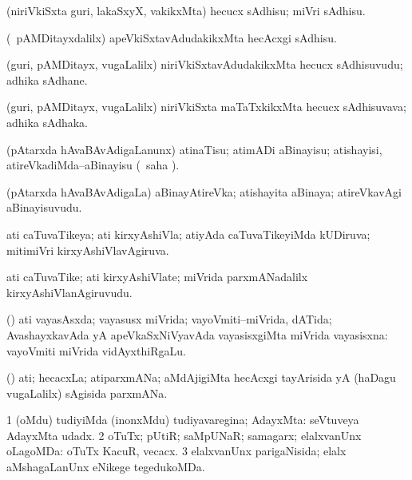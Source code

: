 \bentry
{}
\gl{\sakirx}
\bmng
(niriVkiSxta guri, lakaSxyX, \mo vakikxMta) hecucx sAdhisu; miVri sAdhisu. 
\emng

\noindent
\gl{\akirx}
\bmng
(\kanmu\ pAMDitayxdalilx) apeVkiSxtavAdudakikxMta hecAcxgi sAdhisu. 
\emng
\eentry

\bentry
{}
\gl{\nA}
\bmng
(guri, pAMDitayx, \mo vugaLalilx) niriVkiSxtavAdudakikxMta hecucx sAdhisuvudu; adhika sAdhane. 
\emng
\eentry

\bentry
{}
\gl{\nA}
\bmng
(guri, pAMDitayx, \mo vugaLalilx) niriVkiSxta maTaTxkikxMta hecucx sAdhisuvava; adhika sAdhaka. 
\emng
\eentry

\bentry
{}
\gl{\sakirx}
\bmng
(pAtarxda hAvaBAvAdigaLanunx) atinaTisu; atimADi aBinayisu; atishayisi, atireVkadiMda--aBinayisu (\akirx\ saha ). 
\emng
\eentry

\bentry
{}
\gl{\nA}
\bmng
(pAtarxda hAvaBAvAdigaLa) aBinayAtireVka; atishayita aBinaya; atireVkavAgi aBinayisuvudu. 
\emng
\eentry

\bentry
{}
\gl{\gu}
\bmng
ati caTuvaTikeya; ati kirxyAshiVla; atiyAda caTuvaTikeyiMda kUDiruva; mitimiVri kirxyAshiVlavAgiruva. 
\emng
\eentry

\bentry
{}
\gl{\nA}
\bmng
ati caTuvaTike; ati kirxyAshiVlate; miVrida parxmANadalilx kirxyAshiVlanAgiruvudu. 
\emng
\eentry

\bentry
{}
\gl{\gu}
\bmng
(\ame) ati vayasAsxda; vayasusx miVrida; vayoVmiti--miVrida, dATida; AvashayxkavAda yA apeVkaSxNiVyavAda vayasisxgiMta miVrida vayasisxna:  vayoVmiti miVrida vidAyxthiRgaLu. 
\emng
\eentry

\bentry
{}
\gl{\nA}
\bmng
(\ame) ati; hecacxLa; atiparxmANa; aMdAjigiMta hecAcxgi tayArisida yA (haDagu \mo vugaLalilx) sAgisida parxmANa. 
\emng
\eentry

\bentry
{}
\gl{\gu}
\bmng
\bnum
\num{1} (oMdu) tudiyiMda (inonxMdu) tudiyavaregina; AdayxMta:  seVtuveya AdayxMta udadx. 
\num{2} oTuTx; pUtiR; saMpUNaR; samagarx; elalxvanUnx oLagoMDa:  oTuTx KacuR, vecacx. 
\num{3} elalxvanUnx parigaNisida; elalx aMshagaLanUnx eNikege tegedukoMDa. 
\enum
\emng
\eentry

